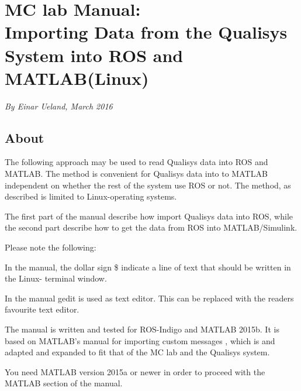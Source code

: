 \documentclass[12pt,a4paper,twoside]{report}
\begin{document}
\pagestyle{plain}



\section{MC lab Manual: \\Importing Data from the Qualisys System into ROS and MATLAB(Linux)}
\textit{By Einar Ueland, March 2016}

\subsection{About}
The following approach may be used to read Qualisys data into ROS and MATLAB.  The method is convenient for    Qualisys data into to MATLAB  independent on whether the rest of the system use ROS or not. The method, as described is limited to Linux-operating systems.


The first part of the manual describe how import Qualisys data into ROS, while the second part describe how to get the data from ROS into MATLAB/Simulink. 



Please note the following:
\begin{itemize}
\begin{item} In the manual, the dollar sign \$ indicate a line of text that should be written in the Linux- terminal window.
 \end{item}
\begin{item} In the manual gedit is used as text editor. This can be replaced with the readers favourite text editor. \end{item}
 \begin{item} The manual is written and tested for ROS-Indigo and MATLAB 2015b. It is based on MATLAB's manual for importing custom messages \citep{ROSGENMSG}, 
which is and adapted and expanded to fit that of the MC lab and the Qualisys system.   \end{item}
\begin{item}
You need MATLAB version 2015a or newer in order to proceed with the MATLAB section of the manual.
 \end{item}
\end{itemize}
\newpage
\end{document}
